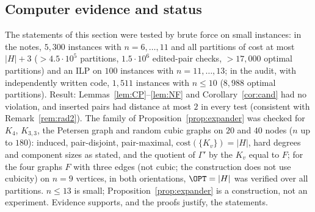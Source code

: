 \subsection{Computer evidence and status}
The statements of this section were tested by brute force on small instances: in the notes, $5{,}300$ instances with $n=6,\dots,11$ and all partitions of cost at most $|H|+3$ ($>4.5\cdot10^5$ partitions, $1.5\cdot10^6$ edited-pair checks, $>17{,}000$ optimal partitions) and an ILP on $100$ instances with $n=11,\dots,13$; in the audit, with independently written code, $1{,}511$ instances with $n\le10$ ($8{,}988$ optimal partitions). Result: Lemmas~\ref{lem:CP}--\ref{lem:NF} and Corollary~\ref{cor:cand} had no violation, and inserted pairs had distance at most $2$ in every test (consistent with Remark~\ref{rem:rad2}). The family of Proposition~\ref{prop:expander} was checked for $K_4$, $K_{3,3}$, the Petersen graph and random cubic graphs on $20$ and $40$ nodes ($n$ up to $180$): induced, pair-disjoint, pair-maximal, $\mathrm{cost}(\{K_v\})=|H|$, hard degrees and component sizes as stated, and the quotient of $\Gamma'$ by the $K_v$ equal to $F$; for the four graphs $F$ with three edges (not cubic; the construction does not use cubicity) on $n=9$ vertices, in both orientations, $\OPT=|H|$ was verified over all partitions. $n\le13$ is small; Proposition~\ref{prop:expander} is a construction, not an experiment. Evidence supports, and the proofs justify, the statements.

